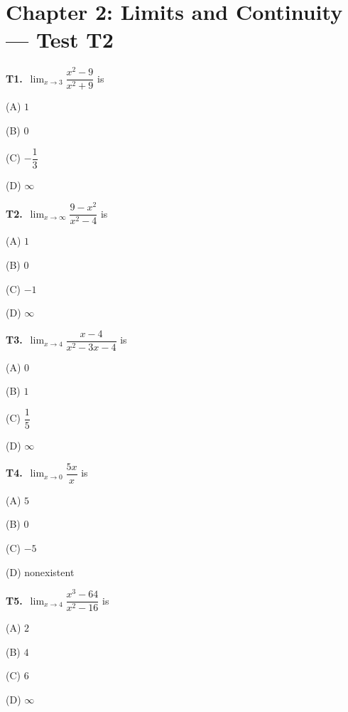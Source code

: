 \documentclass[11pt]{article}
\begin{document}
\section*{Chapter 2: Limits and Continuity --- Test T2}

\bigskip\noindent\textbf{T1.}\ $\displaystyle\lim_{x\to 3}\dfrac{x^2-9}{x^2+9}$ is
\begin{list}{}{\setlength{\leftmargin}{3em}\setlength{\labelwidth}{2.5em}\setlength{\itemsep}{0pt}\setlength{\topsep}{2pt}}
\item[(A)] $1$
\item[(B)] $0$
\item[(C)] $-\dfrac{1}{3}$
\item[(D)] $\infty$
\end{list}

\bigskip\noindent\textbf{T2.}\ $\displaystyle\lim_{x\to\infty}\dfrac{9-x^2}{x^2-4}$ is
\begin{list}{}{\setlength{\leftmargin}{3em}\setlength{\labelwidth}{2.5em}\setlength{\itemsep}{0pt}\setlength{\topsep}{2pt}}
\item[(A)] $1$
\item[(B)] $0$
\item[(C)] $-1$
\item[(D)] $\infty$
\end{list}

\bigskip\noindent\textbf{T3.}\ $\displaystyle\lim_{x\to 4}\dfrac{x-4}{x^2-3x-4}$ is
\begin{list}{}{\setlength{\leftmargin}{3em}\setlength{\labelwidth}{2.5em}\setlength{\itemsep}{0pt}\setlength{\topsep}{2pt}}
\item[(A)] $0$
\item[(B)] $1$
\item[(C)] $\dfrac{1}{5}$
\item[(D)] $\infty$
\end{list}

\bigskip\noindent\textbf{T4.}\ $\displaystyle\lim_{x\to 0}\dfrac{5x}{x}$ is
\begin{list}{}{\setlength{\leftmargin}{3em}\setlength{\labelwidth}{2.5em}\setlength{\itemsep}{0pt}\setlength{\topsep}{2pt}}
\item[(A)] $5$
\item[(B)] $0$
\item[(C)] $-5$
\item[(D)] nonexistent
\end{list}

\bigskip\noindent\textbf{T5.}\ $\displaystyle\lim_{x\to 4}\dfrac{x^3-64}{x^2-16}$ is
\begin{list}{}{\setlength{\leftmargin}{3em}\setlength{\labelwidth}{2.5em}\setlength{\itemsep}{0pt}\setlength{\topsep}{2pt}}
\item[(A)] $2$
\item[(B)] $4$
\item[(C)] $6$
\item[(D)] $\infty$
\end{list}
\end{document}

